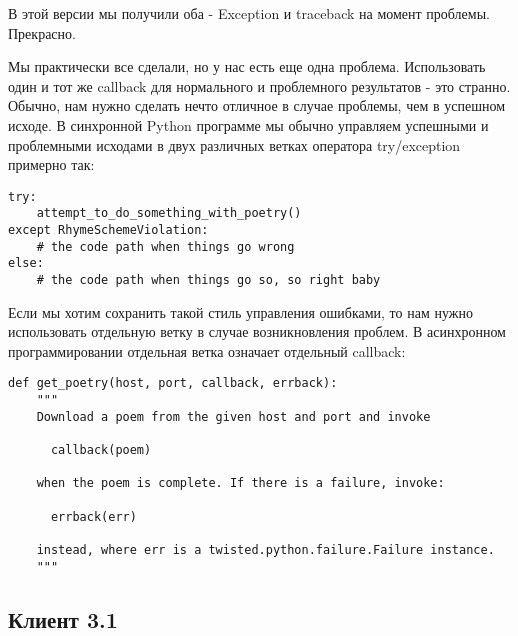 В этой версии мы получили оба - Exception и traceback на 
момент проблемы. Прекрасно.


Мы практически все сделали, но у нас есть еще одна проблема. 
Использовать один и тот же callback для нормального и проблемного  
результатов - это странно. Обычно, нам нужно сделать нечто отличное
 в случае проблемы, чем в успешном исходе. 
В синхронной Python программе мы обычно управляем успешными и 
проблемными исходами в двух различных ветках оператора try/exception 
примерно так:

 \begin{verbatim}
try:
    attempt_to_do_something_with_poetry()
except RhymeSchemeViolation:
    # the code path when things go wrong
else:
    # the code path when things go so, so right baby
\end{verbatim} 


Если мы хотим сохранить такой стиль управления ошибками, то нам 
нужно использовать отдельную ветку в случае возникновления проблем. 
В асинхронном программировании отдельная ветка означает отдельный 
callback: 

 \begin{verbatim}
def get_poetry(host, port, callback, errback):
    """
    Download a poem from the given host and port and invoke

      callback(poem)

    when the poem is complete. If there is a failure, invoke:

      errback(err)

    instead, where err is a twisted.python.failure.Failure instance.
    """
\end{verbatim} 

\subsection{Клиент 3.1}

